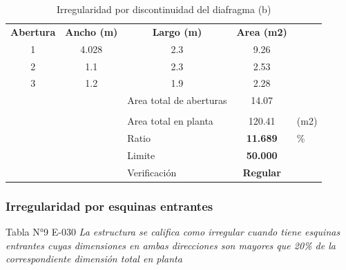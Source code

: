\documentclass[12pt]{article}
\begin{document}
\begin{table}[h!]
  \centering
  \caption{Irregularidad por discontinuidad del diafragma (b)}
    \begin{tabular}{rr|l|c|r}
\cline{1-4}    \multicolumn{1}{|c|}{\textbf{Abertura}} & \multicolumn{1}{c|}{\textbf{Ancho (m)}} & \multicolumn{1}{c|}{\textbf{Largo (m)}} & \textbf{Area (m2)} &  \\
\cline{1-4}    \multicolumn{1}{|c|}{1} & \multicolumn{1}{c|}{4.028} & \multicolumn{1}{c|}{2.3} & 9.26  &  \\
\cline{1-4}    \multicolumn{1}{|c|}{2} & \multicolumn{1}{c|}{1.1} & \multicolumn{1}{c|}{2.3} & 2.53  &  \\
\cline{1-4}    \multicolumn{1}{|c|}{3} & \multicolumn{1}{c|}{1.2} & \multicolumn{1}{c|}{1.9} & 2.28  &  \\
\cline{1-4}          &       & Area total de aberturas & 14.07 &  \\
\cline{3-4}          & \multicolumn{1}{r}{} & \multicolumn{1}{r}{} & \multicolumn{1}{r}{} &  \\
\cline{3-4}          &       & Area total en planta  & 120.41 & \multicolumn{1}{l}{(m2)} \\
\cline{3-4}          &       & Ratio   & \textbf{11.689} & \multicolumn{1}{l}{\%} \\
\cline{3-4}          &       & Limite & \textbf{50.000} &  \\
\cline{3-4}          &       & Verificación & \textcolor[rgb]{ .267,  .447,  .769}{\textbf{Regular}} &  \\
\cline{3-4}    \end{tabular}%
  \label{tab:addlabel}%
\end{table}%

\subsubsection{Irregularidad por esquinas entrantes}

\begin{mybox2}{Tabla N°9 E-030}
\textit{La estructura se califica como irregular cuando tiene esquinas 
entrantes  cuyas  dimensiones  en  ambas  direcciones  son 
mayores que 20\% de la correspondiente dimensión total en 
planta}
\end{mybox2}
\end{document}
